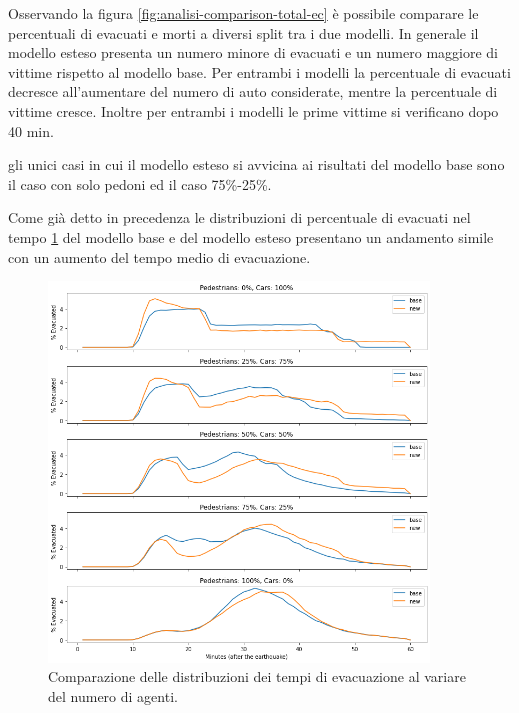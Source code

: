 Osservando la figura \ref{fig:analisi-comparison-total-ec} è possibile comparare le percentuali di evacuati e morti a diversi split tra i due modelli.
In generale il modello esteso presenta un numero minore di evacuati e un numero maggiore di vittime rispetto al modello base.
Per entrambi i modelli la percentuale di evacuati decresce all'aumentare del numero di auto considerate, mentre la percentuale di vittime cresce.
Inoltre per entrambi i modelli le prime vittime si verificano dopo 40 min.

gli unici casi in cui il modello esteso si avvicina ai risultati del modello base sono il caso con solo pedoni ed il caso 75\%-25\%.


Come già detto in precedenza le distribuzioni di percentuale di evacuati nel tempo \ref{fig:analisi-comparison-evtimes} del modello base e del modello esteso 
presentano un andamento simile con un aumento del tempo medio di evacuazione.


\begin{figure}[ht]
    \centering
    \includegraphics[width=0.9\textwidth]{images/analisi/comparison-evtimes.png}
    \caption{Comparazione delle distribuzioni dei tempi di evacuazione al variare del numero di agenti.}
    \label{fig:analisi-comparison-evtimes}
\end{figure}


